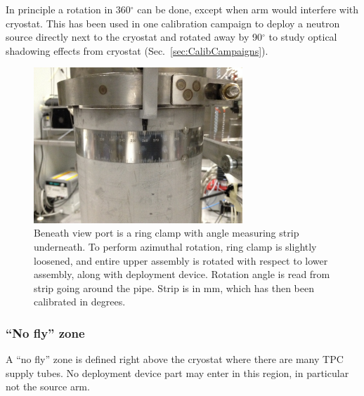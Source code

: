In principle a rotation in 360$^\circ$ can be done, except when arm would interfere with cryostat. This has been used in one calibration campaign to deploy a neutron source directly next to the cryostat and rotated away by 90$^\circ$ to study optical shadowing effects from cryostat (Sec.~\ref{sec:CalibCampaigns}). 





\begin{figure}[htbp]
 \centering
  \includegraphics[width=0.7\textwidth]{Figures/RingClamp_WithPin_IMG_2669.JPG}
  \caption{Beneath view port is a ring clamp with angle measuring strip underneath. To perform azimuthal rotation, ring clamp is slightly loosened, and entire upper assembly is rotated with respect to lower assembly, along with deployment device. Rotation angle is read from strip going around the pipe. Strip is in mm, which has then been calibrated in degrees.}
  \label{fig:ring_clamp}
\end{figure} 

\subsubsection{``No fly'' zone}
A ``no fly'' zone is defined right above the cryostat where there are many TPC supply tubes. No deployment device part may enter in this region, in particular not the source arm.

